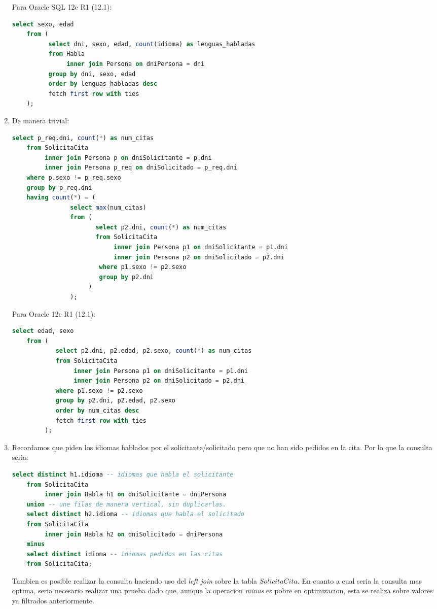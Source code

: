 \begin{enumerate}
	Para Oracle SQL 12c R1 (12.1):
	\begin{lstlisting}[language=sql]
	select sexo, edad
	from (
		  select dni, sexo, edad, count(idioma) as lenguas_habladas
		  from Habla
		  	   inner join Persona on dniPersona = dni
		  group by dni, sexo, edad
		  order by lenguas_habladas desc
		  fetch first row with ties	
	);\end{lstlisting}

	\item De manera trivial:
	\begin{lstlisting}[language=sql]
	select p_req.dni, count(*) as num_citas
	from SolicitaCita
		 inner join Persona p on dniSolicitante = p.dni
		 inner join Persona p_req on dniSolicitado = p_req.dni
	where p.sexo != p_req.sexo
	group by p_req.dni
	having count(*) = (
				select max(num_citas)
				from (
					   select p2.dni, count(*) as num_citas
					   from SolicitaCita
					   		inner join Persona p1 on dniSolicitante = p1.dni
					   		inner join Persona p2 on dniSolicitado = p2.dni
					   	where p1.sexo != p2.sexo
					   	group by p2.dni
					 )
				);\end{lstlisting}
	\newpage
	Para Oracle 12c R1 (12.1):
	\begin{lstlisting}[language=sql]
	select edad, sexo
	from (
			select p2.dni, p2.edad, p2.sexo, count(*) as num_citas
			from SolicitaCita
				 inner join Persona p1 on dniSolicitante = p1.dni
	 			 inner join Persona p2 on dniSolicitado = p2.dni
			where p1.sexo != p2.sexo
			group by p2.dni, p2.edad, p2.sexo
			order by num_citas desc
			fetch first row with ties
		 );\end{lstlisting}
	
	\item Recordamos que piden los idiomas hablados por el solicitante/solicitado pero que no han sido pedidos en la cita. Por lo que la consulta seria:
	\begin{lstlisting}[language=sql]
	select distinct h1.idioma -- idiomas que habla el solicitante
	from SolicitaCita
		 inner join Habla h1 on dniSolicitante = dniPersona
	union -- une filas de manera vertical, sin duplicarlas.
	select distinct h2.idioma -- idiomas que habla el solicitado
	from SolicitaCita
		 inner join Habla h2 on dniSolicitado = dniPersona
	minus
	select distinct idioma -- idiomas pedidos en las citas
	from SolicitaCita;\end{lstlisting}
	
	Tambien es posible realizar la consulta haciendo uso del \textit{left join} sobre la tabla $SolicitaCita$.
	En cuanto a cual seria la consulta mas optima, seria necesario realizar una prueba dado que, aunque la operacion \textit{minus} es pobre en optimizacion, esta se realiza sobre valores ya filtrados anteriormente.
	

\end{enumerate}
